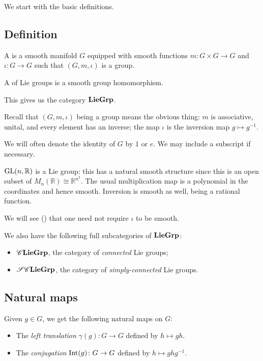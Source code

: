 \documentclass[12pt]{article}
\begin{document}
We start with the basic definitions.

\subsection{Definition}

\begin{defn}
	A  is a smooth manifold $G$ equipped with smooth functions $m \colon G \times G \to G$ and $\iota \colon G \to G$ such that $(G, m, \iota)$ is a group.

	A  of Lie groups is a smooth group homomorphism. 

	This gives us the category $\mathbf{LieGrp}$.
\end{defn}
Recall that $(G, m, \iota)$ being a group means the obvious thing: $m$ is associative, unital, and every element has an inverse; 
the map $\iota$ is the inversion map $g \mapsto g^{-1}$.

We will often denote the identity of $G$ by $1$ or $e$. We may include a subscript if necessary.

\begin{ex}
	$\operatorname{GL}(n, \mathbb{R})$ is a Lie group: this has a natural smooth structure since this is an open subset of $M_{n}(\mathbb{R}) \cong \mathbb{R}^{n^{2}}$. 
	The usual multiplication map is a polynomial in the coordinates and hence smooth. 
	Inversion is smooth as well, being a rational function.
\end{ex}

\begin{rem}
	We will see () that one need not require $\iota$ to be smooth.
\end{rem}

We also have the following full subcategories of $\mathbf{LieGrp}$:
\begin{itemize}
	\item $\mathscr{C}\mathbf{LieGrp}$, the category of \emph{connected} Lie groups;
	\item $\mathscr{S}\mathscr{C}\mathbf{LieGrp}$, the category of \emph{simply-connected} Lie groups.
\end{itemize}

\subsection{Natural maps}

Given $g \in G$, we get the following natural maps on $G$:
\begin{itemize}
	\item The \emph{left translation} $\gamma(g) \colon G \to G$ defined by $h \mapsto gh$.
	\item The \emph{conjugation} $\operatorname{Int}(g) \colon G \to G$ defined by $h \mapsto g h g^{-1}$.
\end{itemize}
\end{document}
